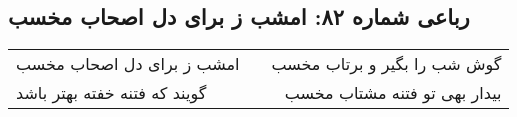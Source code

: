 \begin{center}
\section*{رباعی شماره ۸۲: امشب ز برای دل اصحاب مخسب}
\label{sec:0082}
\begin{longtable}{l p{0.5cm} r}
امشب ز برای دل اصحاب مخسب
&&
گوش شب را بگیر و برتاب مخسب
\\
گویند که فتنه خفته بهتر باشد
&&
بیدار بهی تو فتنه مشتاب مخسب
\\
\end{longtable}
\end{center}
